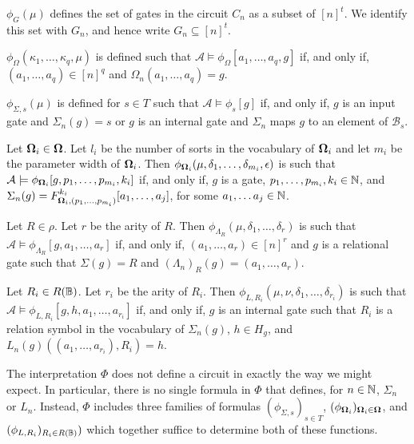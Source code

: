 \documentclass[../main/thesis.tex]{subfiles}
\begin{document}
\begin{myitemize}
\item $\phi_G(\mu)$ defines the set of gates in the circuit $C_n$ as a subset of
  $[n]^t$. We identify this set with $G_n$, and hence write $G_n \subseteq
  [n]^t$.
\item $\phi_{\Omega}(\kappa_1, \ldots , \kappa_q, \mu)$ is defined such that
  $\mathcal{A} \models \phi_\Omega[a_1, \ldots, a_q, g]$ if, and only if, $(a_1,
  \ldots, a_q) \in [n]^q$ and $\Omega_n(a_1, \ldots, a_q) = g$.
\item $\phi_{\Sigma, s} (\mu)$ is defined for $s \in T$ such that $\mathcal{A}
  \models \phi_s [g]$ if, and only if, $g$ is an input gate and $\Sigma_n (g) =
  s$ or $g$ is an internal gate and $\Sigma_n$ maps $g$ to an element of
  $\mathcal{B}_{s}$.
\item Let $\mathbf{\mathbf{\Omega}}_i \in \mathbf{\mathbf{\Omega}}$. Let $l_i$ be the number of sorts in the
  vocabulary of $\mathbf{\mathbf{\Omega}}_i$ and let $m_i$ be the parameter width of $\mathbf{\mathbf{\Omega}}_i$.
  Then $\phi_{\mathbf{\mathbf{\Omega}}_i} (\mu, \delta_1, \ldots, \delta_{m_i}, \epsilon)$ is such
  that $\mathcal{A} \models \phi_{\mathbf{\mathbf{\Omega}}_i}[g, p_1, \ldots, p_{m_i}, k_i]$ if,
  and only if, $g$ is a gate, $p_1, \ldots, p_{m_i}, k_i \in \mathbb{N}$, and
  $\Sigma_n (g) = F^{k_i}_{\mathbf{\mathbf{\Omega}}_i, (p_1, \ldots, p_{m_i})}[a_1, \ldots, a_j]$,
  for some $a_1, \ldots a_j \in \mathbb{N}$.
\item Let $R \in \rho$. Let $r$ be the arity of $R$. Then $\phi_{\Lambda_R}(\mu,
  \delta_1, \ldots, \delta_r)$ is such that $\mathcal{A} \models
  \phi_{\Lambda_R} [g, a_1, \ldots, a_r]$ if, and only if, $(a_1, \ldots, a_r)
  \in [n]^r$ and $g$ is a relational gate such that $\Sigma (g) = R$ and
  $(\Lambda_n)_R (g) = (a_1, \ldots, a_r)$.
\item Let $R_i \in R(\mathbb{B})$. Let $r_i$ be the arity of $R_i$. Then $\phi_{L,
    R_i}(\mu, \nu, \delta_1, \ldots, \delta_{r_i})$ is such that $\mathcal{A}
  \models \phi_{L, R_i}[g, h, a_1, \ldots, a_{r_i}]$ if, and only if, $g$ is an
  internal gate such that $R_i$ is a relation symbol in the vocabulary of
  $\Sigma_n(g)$, $h \in H_g$, and $L_n(g)((a_1, \ldots, a_{r_i}), R_i) = h$.
\end{myitemize}

The interpretation $\Phi$ does not define a circuit in exactly the way we might
expect. In particular, there is no single formula in $\Phi$ that defines, for $n
\in \mathbb{N}$, $\Sigma_n$ or $L_n$. Instead, $\Phi$ includes three families of
formulas $(\phi_{\Sigma, s})_{ s \in T}$, $(\phi_{\mathbf{\mathbf{\Omega}}_i})_{\mathbf{\mathbf{\Omega}}_i \in
  \mathbf{\mathbf{\Omega}}}$, and $(\phi_{L, R_i})_{R_i \in R(\mathbb{B})})$ which together suffice to
determine both of these functions.
\end{document}
